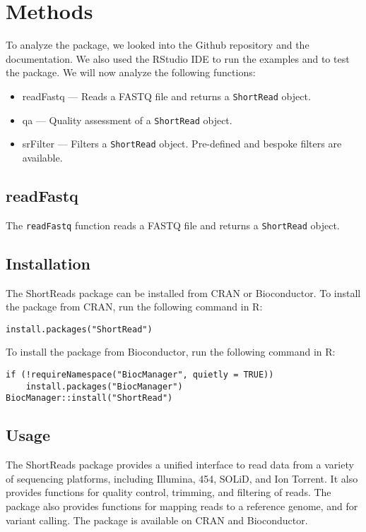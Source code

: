 \documentclass[12pt]{article}
\begin{document}
\section{Methods}
To analyze the package, we looked into the Github repository\cite{shortreadsgit} and the documentation\cite{shortreadsdoc}.
We also used the RStudio IDE to run the examples and to test the package.
We will now analyze the following functions:
\begin{itemize}
    \item readFastq — Reads a FASTQ file and returns a \texttt{ShortRead} object.
    \item qa — Quality assessment of a \texttt{ShortRead} object.
    \item srFilter — Filters a \texttt{ShortRead} object. Pre-defined and bespoke filters are available.  
\end{itemize}


\subsection{readFastq}
The \texttt{readFastq} function reads a FASTQ file and returns a \texttt{ShortRead} object.


\subsection{Installation}
The ShortReads package can be installed from CRAN or Bioconductor. To install the package from CRAN, run the following command in R:
\begin{verbatim}
install.packages("ShortRead")
\end{verbatim}
To install the package from Bioconductor, run the following command in R:
\begin{verbatim}
if (!requireNamespace("BiocManager", quietly = TRUE))
    install.packages("BiocManager")
BiocManager::install("ShortRead")
\end{verbatim}

\subsection{Usage}
The ShortReads package provides a unified interface to read data from a variety of sequencing platforms,
including Illumina, 454, SOLiD, and Ion Torrent.
It also provides functions for quality control, trimming, and filtering of reads.
The package also provides functions for mapping reads to a reference genome, and for variant calling.
The package is available on CRAN and Bioconductor.
\end{document}
